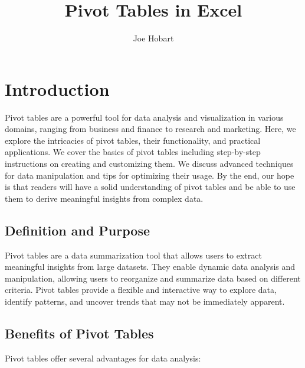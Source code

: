 \documentclass[
]{book}
\title{Pivot Tables in Excel}
\author{Joe Hobart}
\date{}
\begin{document}
\maketitle

{
\setcounter{tocdepth}{1}
\tableofcontents
}
\hypertarget{introduction}{%
\chapter{Introduction}\label{introduction}}

Pivot tables are a powerful tool for data analysis and visualization in various domains, ranging from business and finance to research and marketing. Here, we explore the intricacies of pivot tables, their functionality, and practical applications. We cover the basics of pivot tables including step-by-step instructions on creating and customizing them. We discuss advanced techniques for data manipulation and tips for optimizing their usage. By the end, our hope is that readers will have a solid understanding of pivot tables and be able to use them to derive meaningful insights from complex data.

\hypertarget{definition-and-purpose}{%
\section{Definition and Purpose}\label{definition-and-purpose}}

Pivot tables are a data summarization tool that allows users to extract meaningful insights from large datasets. They enable dynamic data analysis and manipulation, allowing users to reorganize and summarize data based on different criteria. Pivot tables provide a flexible and interactive way to explore data, identify patterns, and uncover trends that may not be immediately apparent.

\hypertarget{benefits-of-pivot-tables}{%
\section{Benefits of Pivot Tables}\label{benefits-of-pivot-tables}}

Pivot tables offer several advantages for data analysis:
\end{document}
